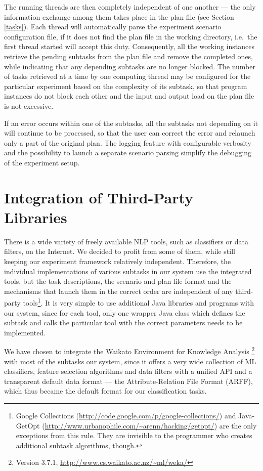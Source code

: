 \documentclass[12pt,notitlepage,a4paper]{report}
\begin{document}
The running threads are then completely independent of one another --- the only information exchange among them takes place in the plan file (see Section \ref{tasks}). Each thread will automatically parse the experiment scenario configuration file, if it does not find the plan file in the working directory, i.e.\ the first thread started will accept this duty. Consequently, all the working instances retrieve the pending subtasks from the plan file and remove the completed ones, while indicating that any depending subtasks are no longer blocked. The number of tasks retrieved at a time by one computing thread may be configured for the particular experiment based on the complexity of its subtask, so that program instances do not block each other and the input and output load on the plan file is not excessive.

If an error occurs within one of the subtasks, all the subtasks not depending on it will continue to be processed, so that the user can correct the error and relaunch only a part of the original plan. The logging feature with configurable verbosity and the possibility to launch a separate scenario parsing simplify the debugging of the experiment setup.

\section{Integration of Third-Party Libraries}\label{weka}

There is a wide variety of freely available NLP tools, such as classifiers or data filters, on the Internet. We decided to profit from some of them, while still keeping our experiment framework relatively independent. Therefore, the individual implementations of various subtasks in our system use the integrated tools, but the task descriptions, the scenario and plan file format and the mechanisms that launch them in the correct order are independent of any third-party tools\footnote{Google Collections (\url{http://code.google.com/p/google-collections/}) and Java-GetOpt (\url{http://www.urbanophile.com/\~arenn/hacking/getopt/}) are the only exceptions from this rule. They are invisible to the programmer who creates additional subtask algorithms, though.}. It is very simple to use additional Java libraries and programs with our system, since for each tool, only one wrapper Java class which defines the subtask and calls the particular tool with the correct parameters needs to be implemented.

We have chosen to integrate the Waikato Environment for Knowledge Analysis \citep[WEKA, ][]{garner95}\footnote{Version 3.7.1, \url{http://www.cs.waikato.ac.nz/~ml/weka/}} with most of the subtasks our system, since it offers a very wide collection of ML classifiers, feature selection algorithms and data filters with a unified API and a transparent default data format --- the Attribute-Relation File Format (ARFF), which thus became the default format for our classification tasks.
\end{document}
